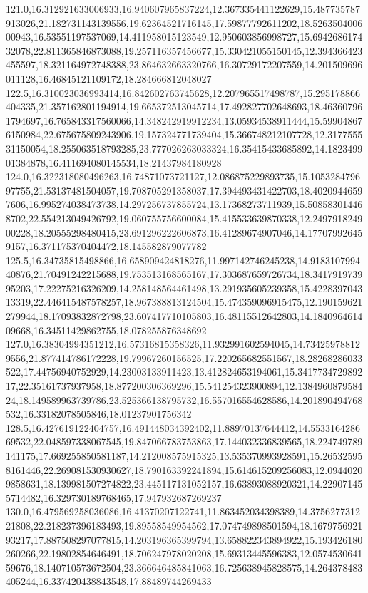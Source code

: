 \documentclass[handout,10pt,t,aspectratio=169]{beamer}
\begin{document}
{121.0,16.312921633006933,16.940607965837224,12.367335441122629,15.487735787913026,21.182731143139556,19.62364521716145,17.59877792611202,18.526350400600943,16.53551197537069,14.411958015123549,12.950603856998727,15.694268617432078,22.811365846873088,19.257116357456677,15.330421055150145,12.394366423455597,18.321164972748388,23.864632663320766,16.30729172207559,14.201509696011128,16.46845121109172,18.284666812048027
122.5,16.310023036993414,16.842602763745628,12.207965517498787,15.295178866404335,21.357162801194914,19.665372513045714,17.492827702648693,18.463607961794697,16.765843317560066,14.348242919912234,13.05934538911444,15.599048676150984,22.675675809243906,19.157324771739404,15.366748212107728,12.317755531150054,18.255063518793285,23.777026263033324,16.35415433685892,14.182349901384878,16.411694080145534,18.21437984180928
124.0,16.322318080496263,16.74871073721127,12.086875229893735,15.105328479697755,21.53137481504057,19.708705291358037,17.394493431422703,18.40209446597606,16.995274038473738,14.297256737855724,13.17368273711939,15.508583014468702,22.554213049426792,19.060755756600084,15.415533639870338,12.249791824900228,18.20555298480415,23.691296222606873,16.41289674907046,14.177079926459157,16.371175370404472,18.145582879077782
125.5,16.34735815498866,16.658909424818276,11.997142746245238,14.918310799440876,21.70491242215688,19.753513168565167,17.303687659726734,18.341791973995203,17.22275216326209,14.258148564461498,13.291935605239358,15.422839704313319,22.446415487578257,18.967388813124504,15.474359096915475,12.190159621279944,18.17093832872798,23.607417710105803,16.48115512642803,14.184096461409668,16.34511429862755,18.078255876348692
127.0,16.38304994351212,16.57316815358326,11.932991602594045,14.734259788129556,21.877414786172228,19.79967260156525,17.220265682551567,18.28268286033522,17.44756940752929,14.23003133911423,13.412824653194061,15.341773472989217,22.35161737937958,18.877200306369296,15.541254323900894,12.138496087958424,18.149589963739786,23.525366138795732,16.557016554628586,14.201890494768532,16.33182078505846,18.01237901756342
128.5,16.427619122404757,16.491448034392402,11.88970137644412,14.553316428669532,22.048597338067545,19.847066783753863,17.144032336839565,18.224749789141175,17.669255850581187,14.212008575915325,13.535370993928591,15.265325958161446,22.269081530930627,18.790163392241894,15.614615209256083,12.09440209858631,18.139981507274822,23.445117131052157,16.63893088920321,14.229071455714482,16.329730189768465,17.947932687269237
130.0,16.479569258036086,16.41370207122741,11.863452034398389,14.375627731221808,22.218237396183493,19.89558549954562,17.074749898501594,18.167975692193217,17.887508297077815,14.203196365399794,13.658822343894922,15.193426180260266,22.19802854646491,18.706247978020208,15.69313445596383,12.057453064159676,18.140710573672504,23.366646485841063,16.725638945828575,14.264378483405244,16.337420438843548,17.88489744269433
}\HestonSmileData
\end{document}
